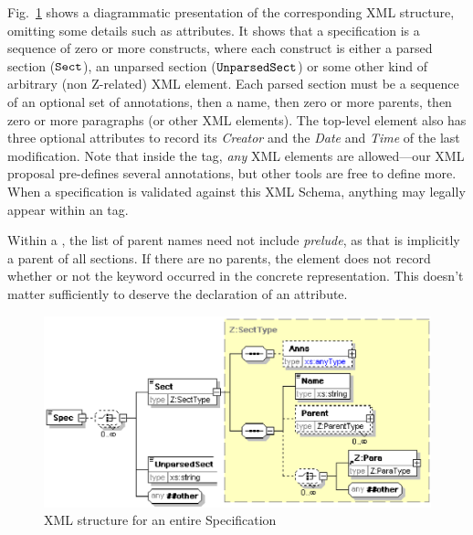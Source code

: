 \documentclass{llncs}  %
\begin{document}
Fig.~\ref{fig:spec}
shows a diagrammatic presentation of the corresponding XML
structure, omitting some details such as attributes.
It shows that a specification is a sequence of zero or more constructs,
where each construct is either a parsed section (${\tt Sect}$), 
an unparsed section (${\tt UnparsedSect}$) or some other kind of
arbitrary (non Z-related) XML element.  Each parsed section must be
a sequence of an optional set of annotations, then a name, then zero or
more parents, then zero or more paragraphs (or other XML elements).
The top-level  element also has three optional attributes to
record its \emph{Creator} and the \emph{Date} and \emph{Time} of the last
modification. 
Note that inside the  tag, \emph{any} XML elements are
allowed---our XML proposal pre-defines several annotations,
but other tools are free to define more.  When a specification is validated
against this XML Schema, anything may legally appear within an 
tag. 

Within a , the list of parent names need not include
\textit{prelude}, as that is implicitly a parent of all sections.
If there are no parents,
the  element does not record whether or not
the keyword  occurred in the concrete representation.
This doesn't matter sufficiently to deserve the declaration of an attribute.

\begin{figure}[htbp]
  \centering
  \includegraphics[width=\textwidth]{spec.eps}
  \caption{XML structure for an entire Specification}
  \label{fig:spec}
\end{figure}
\end{document}
